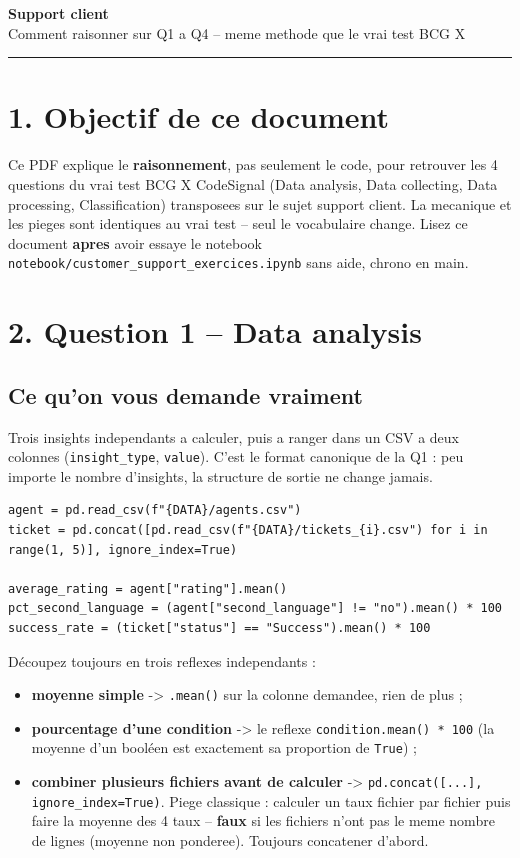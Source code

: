 \documentclass[11pt]{article}
\newcommand{\exhead}[1]{\subsection{#1}}
\begin{document}
\begin{center}
  {\huge\bfseries\color{bcg} Support client}\\[4pt]
  {\large Comment raisonner sur Q1 a Q4 -- meme methode que le vrai test BCG X}
\end{center}
\vspace{4pt}\hrule\vspace{10pt}

\section{1. Objectif de ce document}
Ce PDF explique le \textbf{raisonnement}, pas seulement le code, pour
retrouver les 4 questions du vrai test BCG X CodeSignal (Data analysis,
Data collecting, Data processing, Classification) transposees sur le sujet support client. La mecanique
et les pieges sont identiques au vrai test -- seul le vocabulaire change.
Lisez ce document \textbf{apres} avoir essaye le notebook
\texttt{notebook/customer\_support\_exercices.ipynb} sans
aide, chrono en main.

\section{2. Question 1 -- Data analysis}

\exhead{Ce qu'on vous demande vraiment}
Trois \og insights \fg{} independants a calculer, puis a ranger dans un
CSV a deux colonnes (\texttt{insight\_type}, \texttt{value}). C'est le
format canonique de la Q1 : peu importe le nombre d'insights, la structure
de sortie ne change jamais.

\begin{lstlisting}
agent = pd.read_csv(f"{DATA}/agents.csv")
ticket = pd.concat([pd.read_csv(f"{DATA}/tickets_{i}.csv") for i in range(1, 5)], ignore_index=True)

average_rating = agent["rating"].mean()
pct_second_language = (agent["second_language"] != "no").mean() * 100
success_rate = (ticket["status"] == "Success").mean() * 100
\end{lstlisting}

\begin{explik}
D\'ecoupez toujours en trois reflexes independants :
\begin{itemize}[nosep]
  \item \textbf{moyenne simple} -> \texttt{.mean()} sur la colonne
        demandee, rien de plus ;
  \item \textbf{pourcentage d'une condition} -> le reflexe
        \texttt{condition.mean() * 100} (la moyenne d'un bool\'een est
        exactement sa proportion de \texttt{True}) ;
  \item \textbf{combiner plusieurs fichiers avant de calculer} ->
        \texttt{pd.concat([...], ignore\_index=True)}. Piege classique :
        calculer un taux fichier par fichier puis faire la moyenne des 4
        taux -- \textbf{faux} si les fichiers n'ont pas le meme nombre de
        lignes (moyenne non ponderee). Toujours concatener d'abord.
\end{itemize}
\end{explik}
\end{document}
